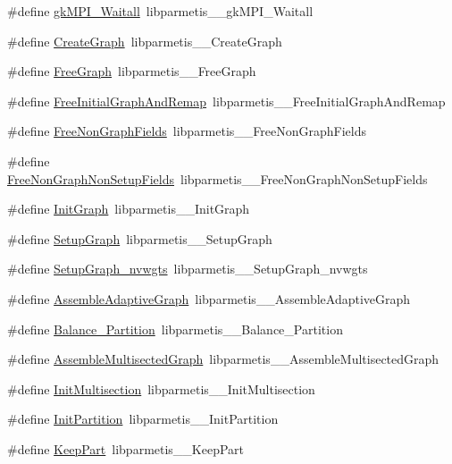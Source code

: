 \begin{DoxyCompactItemize}
\item 
\#define \hyperlink{a00960_acead93b50c8b9b596e95e60a8d259d58}{gk\+M\+P\+I\+\_\+\+Waitall}~libparmetis\+\_\+\+\_\+gk\+M\+P\+I\+\_\+\+Waitall
\item 
\#define \hyperlink{a00960_a9f98f0bd10eaa718b4a9d033cc5d5e24}{Create\+Graph}~libparmetis\+\_\+\+\_\+\+Create\+Graph
\item 
\#define \hyperlink{a00960_a6e9acb09cd52f2f13ba10dee86986a53}{Free\+Graph}~libparmetis\+\_\+\+\_\+\+Free\+Graph
\item 
\#define \hyperlink{a00960_a5430379a72920a77c5dc1ed5298a01f4}{Free\+Initial\+Graph\+And\+Remap}~libparmetis\+\_\+\+\_\+\+Free\+Initial\+Graph\+And\+Remap
\item 
\#define \hyperlink{a00960_ae0c03c9de8876a8e393bd1cd9af63256}{Free\+Non\+Graph\+Fields}~libparmetis\+\_\+\+\_\+\+Free\+Non\+Graph\+Fields
\item 
\#define \hyperlink{a00960_a662accb5bd14c06b0f9ae3ac681dc8a5}{Free\+Non\+Graph\+Non\+Setup\+Fields}~libparmetis\+\_\+\+\_\+\+Free\+Non\+Graph\+Non\+Setup\+Fields
\item 
\#define \hyperlink{a00960_a9b657db42e7bd21fca4dcff53f76d445}{Init\+Graph}~libparmetis\+\_\+\+\_\+\+Init\+Graph
\item 
\#define \hyperlink{a00960_a87e626056c844391adf0e3ea0f51d303}{Setup\+Graph}~libparmetis\+\_\+\+\_\+\+Setup\+Graph
\item 
\#define \hyperlink{a00960_a67a882a5670ea6c725177a3d98915b41}{Setup\+Graph\+\_\+nvwgts}~libparmetis\+\_\+\+\_\+\+Setup\+Graph\+\_\+nvwgts
\item 
\#define \hyperlink{a00960_a31db4f36fc599a4101f57b2cfd6a3b60}{Assemble\+Adaptive\+Graph}~libparmetis\+\_\+\+\_\+\+Assemble\+Adaptive\+Graph
\item 
\#define \hyperlink{a00960_ac186d1e0a361551b37225a667d9d1679}{Balance\+\_\+\+Partition}~libparmetis\+\_\+\+\_\+\+Balance\+\_\+\+Partition
\item 
\#define \hyperlink{a00960_afbe4773676e07ca1d541f0fb8bea033d}{Assemble\+Multisected\+Graph}~libparmetis\+\_\+\+\_\+\+Assemble\+Multisected\+Graph
\item 
\#define \hyperlink{a00960_a0784485e2a22b95f4d7d9a0a6ed5680d}{Init\+Multisection}~libparmetis\+\_\+\+\_\+\+Init\+Multisection
\item 
\#define \hyperlink{a00960_af06cd2f1a2c8215b717779fc927ab5ef}{Init\+Partition}~libparmetis\+\_\+\+\_\+\+Init\+Partition
\item 
\#define \hyperlink{a00960_abb116442deb8ccf897db283a6f451231}{Keep\+Part}~libparmetis\+\_\+\+\_\+\+Keep\+Part

\end{DoxyCompactItemize}
